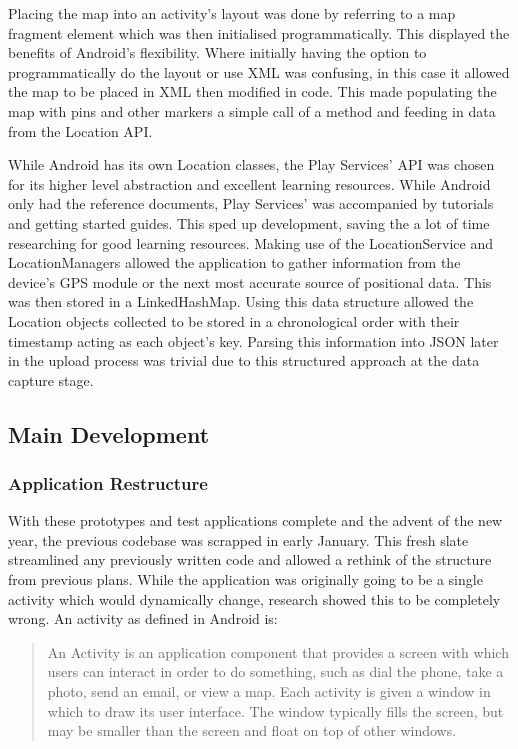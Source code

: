 \documentclass{l3proj}
\begin{document}
Placing the map into an activity's layout was done by referring to a map fragment element which was then initialised programmatically. This displayed the benefits of Android's flexibility. Where initially having the option to programmatically do the layout or use XML was confusing, in this case it allowed the map to be placed in XML then modified in code. This made populating the map with pins and other markers a simple call of a method and feeding in data from the Location API.

While Android has its own Location classes, the Play Services' API was chosen for its higher level abstraction and excellent learning resources. While Android only had the reference documents, Play Services' was accompanied by tutorials and getting started guides. This sped up development, saving the a lot of time researching for good learning resources. Making use of the LocationService and LocationManagers allowed the application to gather information from the device's GPS module or the next most accurate source of positional data. This was then stored in a LinkedHashMap. Using this data structure allowed the Location objects collected to be stored in a chronological order with their timestamp acting as each object's key. Parsing this information into JSON later in the upload process was trivial due to this structured approach at the data capture stage.

\subsection{Main Development}
\subsubsection{Application Restructure}
With these prototypes and test applications complete and the advent of the new year, the previous codebase was scrapped in early January. This fresh slate streamlined any previously written code and allowed a rethink of the structure from previous plans. While the application was originally going to be a single activity which would dynamically change, research showed this to be completely wrong. An activity as defined in Android is:

\blockquote{An Activity is an application component that provides a screen with which users can interact in order to do something, such as dial the phone, take a photo, send an email, or view a map. Each activity is given a window in which to draw its user interface. The window typically fills the screen, but may be smaller than the screen and float on top of other windows.}
\end{document}
